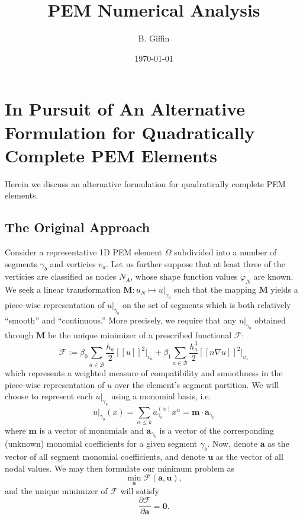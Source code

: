 \documentclass[12pt]{article}
\title{PEM Numerical Analysis}
\author{B. Giffin}
\date{\today}
\begin{document}

\section*{In Pursuit of An Alternative Formulation for Quadratically Complete PEM Elements}

Herein we discuss an alternative formulation for quadratically complete PEM elements.

\subsection*{The Original Approach}

Consider a representative 1D PEM element $\Omega$ subdivided into a number of segments $\gamma_b$ and verticies $v_a$. Let us further suppose that at least three of the verticies are classified as nodes $N_A$, whose shape function values $\varphi_N$ are known. We seek a linear transformation $\mathbf{M} : u_N \mapsto u|_{\gamma_b}$ such that the mapping $\mathbf{M}$ yields a piece-wise representation of $u|_{\gamma_b}$ on the set of segments which is both relatively ``smooth'' and ``continuous.'' More precisely, we require that any $u|_{\gamma_b}$ obtained through $\mathbf{M}$ be the unique minimizer of a prescribed functional $\mathcal{F}$:
\begin{equation}
        \mathcal{F} := \beta_0 \sum_{a \in \bar{\mathcal{B}}} \frac{h_a}{2} [\![ u ]\!]^2 \bigg|_{v_a} + \beta_1 \sum_{a \in \mathcal{B}} \frac{h_a^3}{2} [\![ n \nabla u ]\!]^2 \bigg|_{v_a}
\end{equation}
which represents a weighted measure of compatibility and smoothness in the piece-wise representation of $u$ over the element's segment partition. We will choose to represent each $u|_{\gamma_b}$ using a monomial basis, i.e.
\begin{equation}
     u |_{\gamma_b} (x) = \sum_{\alpha \leq k} a_{\gamma_b}^{(\alpha)} x^{\alpha} = \mathbf{m} \cdot \mathbf{a}_{\gamma_b}
\end{equation}
where $\mathbf{m}$ is a vector of monomials and $\mathbf{a}_{\gamma_b}$ is a vector of the corresponding (unknown) monomial coefficients for a given segment $\gamma_b$. Now, denote $\mathbf{a}$ as the vector of all segment monomial coefficients, and denote $\mathbf{u}$ as the vector of all nodal values. We may then formulate our minimum problem as
\begin{equation}
        \min_{\mathbf{a}} \mathcal{F} (\mathbf{a}, \mathbf{u}),
\end{equation}
and the unique minimizer of $\mathcal{F}$ will satisfy
\begin{equation}
        \frac{\partial \mathcal{F}}{\partial \mathbf{a}} = \mathbf{0}.
\end{equation}
\end{document}
